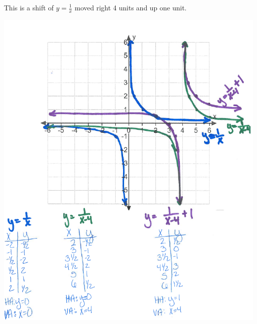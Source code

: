 \documentclass[nooutcomes]{ximera}
\begin{document}
\begin{problem}
\begin{enumerate}
	\begin{freeResponse}
		This is a shift of $y=\frac{1}{x}$ moved right 4 units and up one unit.
		\begin{image}		
	\includegraphics[scale=0.7]{Figure7.png}
	\end{image}
	\end{freeResponse}
\end{enumerate}

\end{problem}
\end{document}
